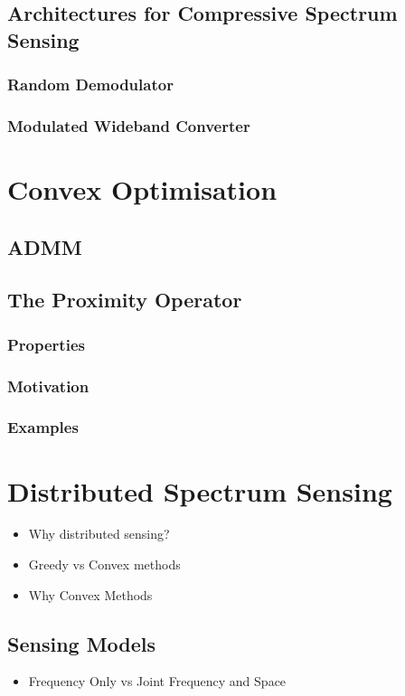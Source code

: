 \documentclass{article}
\begin{document}
\subsection{Architectures for Compressive Spectrum Sensing}

\subsubsection{Random Demodulator}

\subsubsection{Modulated Wideband Converter}



\section{Convex Optimisation}

\subsection{ADMM}
\subsection{The Proximity Operator}
\subsubsection{Properties}
\subsubsection{Motivation}
\subsubsection{Examples}


\section{Distributed Spectrum Sensing}
\begin{itemize}
\item Why distributed sensing?
\item Greedy vs Convex methods
\item Why Convex Methods
\end{itemize}

\subsection{Sensing Models}
\begin{itemize}
\item Frequency Only vs Joint Frequency and Space
\end{itemize}
\end{document}
